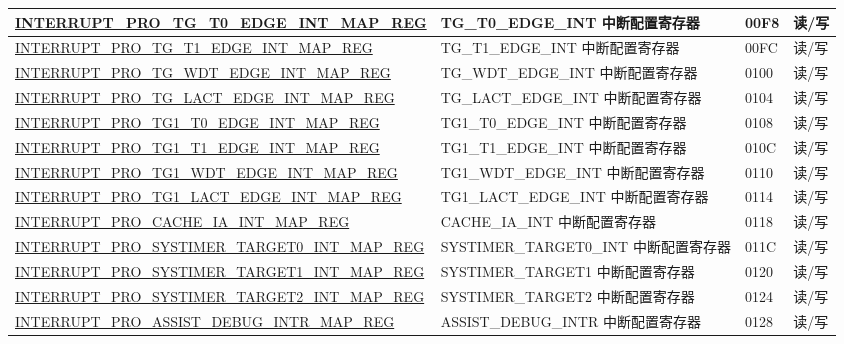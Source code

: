 \begin{longtable}{ | m{9.3cm} | m{9.2cm} | m{1.3cm} | m{1.2cm} | }
\hyperref[regdesc:INTERRUPTPROTGT0EDGEINTMAPREG]{INTERRUPT\_PRO\_TG\_T0\_EDGE\_INT\_MAP\_REG} & TG\_T0\_EDGE\_INT 中断配置寄存器 & \hexprefix{}00F8 &读/写 \\ \hline
\hyperref[regdesc:INTERRUPTPROTGT1EDGEINTMAPREG]{INTERRUPT\_PRO\_TG\_T1\_EDGE\_INT\_MAP\_REG} & TG\_T1\_EDGE\_INT 中断配置寄存器 & \hexprefix{}00FC &读/写 \\ \hline
\hyperref[regdesc:INTERRUPTPROTGWDTEDGEINTMAPREG]{INTERRUPT\_PRO\_TG\_WDT\_EDGE\_INT\_MAP\_REG} & TG\_WDT\_EDGE\_INT 中断配置寄存器 & \hexprefix{}0100 &读/写 \\ \hline
\hyperref[regdesc:INTERRUPTPROTGLACTEDGEINTMAPREG]{INTERRUPT\_PRO\_TG\_LACT\_EDGE\_INT\_MAP\_REG} & TG\_LACT\_EDGE\_INT 中断配置寄存器 & \hexprefix{}0104 &读/写 \\ \hline
\hyperref[regdesc:INTERRUPTPROTG1T0EDGEINTMAPREG]{INTERRUPT\_PRO\_TG1\_T0\_EDGE\_INT\_MAP\_REG} & TG1\_T0\_EDGE\_INT 中断配置寄存器 & \hexprefix{}0108 &读/写 \\ \hline
\hyperref[regdesc:INTERRUPTPROTG1T1EDGEINTMAPREG]{INTERRUPT\_PRO\_TG1\_T1\_EDGE\_INT\_MAP\_REG} & TG1\_T1\_EDGE\_INT 中断配置寄存器 & \hexprefix{}010C &读/写 \\ \hline
\hyperref[regdesc:INTERRUPTPROTG1WDTEDGEINTMAPREG]{INTERRUPT\_PRO\_TG1\_WDT\_EDGE\_INT\_MAP\_REG} & TG1\_WDT\_EDGE\_INT 中断配置寄存器 & \hexprefix{}0110 &读/写 \\ \hline
\hyperref[regdesc:INTERRUPTPROTG1LACTEDGEINTMAPREG]{INTERRUPT\_PRO\_TG1\_LACT\_EDGE\_INT\_MAP\_REG} & TG1\_LACT\_EDGE\_INT 中断配置寄存器 & \hexprefix{}0114 &读/写 \\ \hline
\hyperref[regdesc:INTERRUPTPROCACHEIAINTMAPREG]{INTERRUPT\_PRO\_CACHE\_IA\_INT\_MAP\_REG} & CACHE\_IA\_INT 中断配置寄存器 & \hexprefix{}0118 &读/写 \\ \hline
\hyperref[regdesc:INTERRUPTPROSYSTIMERTARGET0INTMAPREG]{INTERRUPT\_PRO\_SYSTIMER\_TARGET0\_INT\_MAP\_REG} & SYSTIMER\_TARGET0\_INT 中断配置寄存器 & \hexprefix{}011C &读/写 \\ \hline
\hyperref[regdesc:INTERRUPTPROSYSTIMERTARGET1INTMAPREG]{INTERRUPT\_PRO\_SYSTIMER\_TARGET1\_INT\_MAP\_REG} & SYSTIMER\_TARGET1 中断配置寄存器 & \hexprefix{}0120 &读/写 \\ \hline
\hyperref[regdesc:INTERRUPTPROSYSTIMERTARGET2INTMAPREG]{INTERRUPT\_PRO\_SYSTIMER\_TARGET2\_INT\_MAP\_REG} & SYSTIMER\_TARGET2 中断配置寄存器 & \hexprefix{}0124 &读/写 \\ \hline
\hyperref[regdesc:INTERRUPTPROASSISTDEBUGINTRMAPREG]{INTERRUPT\_PRO\_ASSIST\_DEBUG\_INTR\_MAP\_REG} & ASSIST\_DEBUG\_INTR 中断配置寄存器 & \hexprefix{}0128 &读/写 \\ \hline

\end{longtable}
